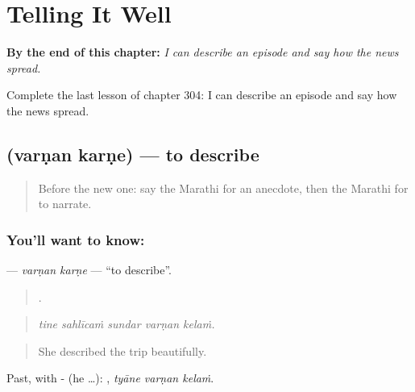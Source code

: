 
\chapter{Telling It Well}
\label{ch:mr-telling-it-well}

\begin{chapteropening}
\textbf{By the end of this chapter:} \emph{I can describe an episode and say how the news spread.}

Complete the last lesson of chapter 304: I can describe an episode and say how the news spread.
\end{chapteropening}

\section[\texorpdfstring{\mr{वर्णन} \mr{करणे} (varṇan karṇe)}{वर्णन करणे (varṇan karṇe)}]{  (varṇan karṇe) — to describe}

\label{lesson:MR-C304-varnan-karne}



\begin{quote}
Before the new one: say the Marathi for an anecdote, then the Marathi for to narrate.
\end{quote}

\subsection*{You'll want to know:  }
\textbf{ } — \emph{varṇan karṇe} — \textquotedblleft{}to describe\textquotedblright{}.

\begin{quote}
    .
\end{quote}

\begin{quote}
\emph{tine sahlīcaṁ sundar varṇan kelaṁ.}
\end{quote}

\begin{quote}
She described the trip beautifully.
\end{quote}

Past, with - (he …):   , \emph{tyāne varṇan kelaṁ}.

